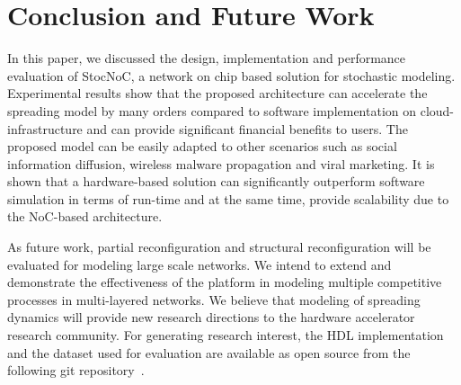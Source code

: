 \section{Conclusion and Future Work}
\label{sec:conclusion}
In this paper, we discussed the design, implementation and performance evaluation of StocNoC, a network on chip based solution for stochastic modeling.
Experimental results show that the proposed architecture can accelerate the spreading model by many orders compared to software implementation on cloud-infrastructure and can provide significant financial benefits to users.
The proposed model can be easily adapted to other scenarios such as social information diffusion, wireless malware propagation and viral marketing.
It is shown that a hardware-based solution can significantly outperform software simulation in terms of run-time and at the same time, provide scalability due to the NoC-based architecture. 

As future work, partial reconfiguration and structural reconfiguration will be evaluated for modeling large scale networks. We intend to extend and demonstrate the effectiveness of the platform in modeling multiple competitive processes in multi-layered networks. 
We believe that modeling of spreading dynamics will provide new research directions to the hardware accelerator research community.
For generating research interest, the HDL implementation and the dataset used for evaluation are available as open source from the following git repository~\cite{sisNoC}.